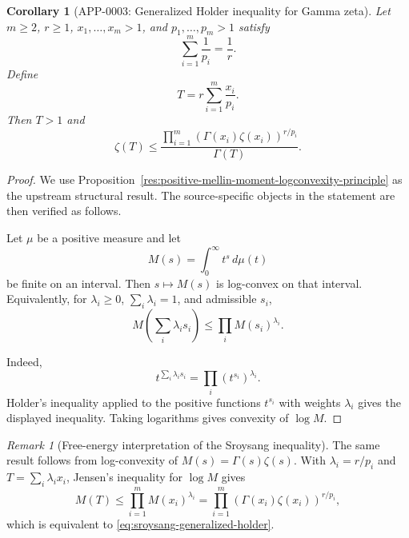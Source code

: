 \documentclass[11pt]{article}
\numberwithin{equation}{section}
\newtheorem{corollary}[theorem]{Corollary}
\theoremstyle{definition}
\theoremstyle{remark}
\newtheorem{remark}[theorem]{Remark}
\newcommand{\1}{\mathbf 1}
\begin{document}
\begin{corollary}[APP-0003: Generalized Holder inequality for Gamma zeta]
\label{thm:sroysang-holder}
Let \(m\ge2\), \(r\ge1\), \(x_1,\ldots,x_m>1\), and \(p_1,\ldots,p_m>1\) satisfy
\begin{equation}
\label{eq:sroysang-holder-condition}
\sum_{i=1}^{m}\frac1{p_i}=\frac1r.
\end{equation}
Define
\begin{equation}
\label{eq:sroysang-t}
T=r\sum_{i=1}^{m}\frac{x_i}{p_i}.
\end{equation}
Then \(T>1\) and
\begin{equation}
\label{eq:sroysang-generalized-holder}
\zeta(T)\le
\frac{\prod_{i=1}^{m}(\Gamma(x_i)\zeta(x_i))^{r/p_i}}{\Gamma(T)}.
\end{equation}


\end{corollary}

\begin{proof}
We use Proposition~\ref{res:positive-mellin-moment-logconvexity-principle} as the upstream structural result. The source-specific objects in the statement are then verified as follows.

Let \(\mu\) be a positive measure and let
\[
M(s)=\int_0^\infty t^s\,d\mu(t)
\]
be finite on an interval. Then \(s\mapsto M(s)\) is log-convex on that interval. Equivalently, for \(\lambda_i\ge0\), \(\sum_i\lambda_i=1\), and admissible \(s_i\),
\[
M\left(\sum_i\lambda_i s_i\right)\le \prod_i M(s_i)^{\lambda_i}.
\]

Indeed,
\[
t^{\sum_i\lambda_i s_i}=\prod_i (t^{s_i})^{\lambda_i}.
\]
Holder's inequality applied to the positive functions \(t^{s_i}\) with weights \(\lambda_i\) gives the displayed inequality. Taking logarithms gives convexity of \(\log M\).
\end{proof}

\begin{remark}[Free-energy interpretation of the Sroysang inequality]
The same result follows from log-convexity of \(M(s)=\Gamma(s)\zeta(s)\).  With \(\lambda_i=r/p_i\) and \(T=\sum_i\lambda_ix_i\), Jensen's inequality for \(\log M\) gives
\begin{equation}
\label{eq:sroysang-jensen}
M(T)\le\prod_{i=1}^{m}M(x_i)^{\lambda_i}
=\prod_{i=1}^{m}(\Gamma(x_i)\zeta(x_i))^{r/p_i},
\end{equation}
which is equivalent to \eqref{eq:sroysang-generalized-holder}.
\end{remark}
\end{document}
